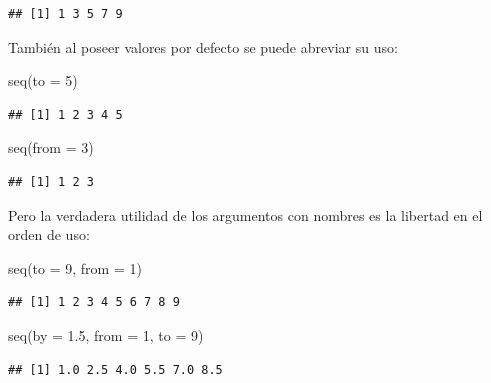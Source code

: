 \documentclass[
]{book}
\newenvironment{Shaded}{\begin{snugshade}}{\end{snugshade}}
\newcommand{\AttributeTok}[1]{\textcolor[rgb]{0.77,0.63,0.00}{#1}}
\newcommand{\DecValTok}[1]{\textcolor[rgb]{0.00,0.00,0.81}{#1}}
\newcommand{\FloatTok}[1]{\textcolor[rgb]{0.00,0.00,0.81}{#1}}
\newcommand{\FunctionTok}[1]{\textcolor[rgb]{0.00,0.00,0.00}{#1}}
\newcommand{\NormalTok}[1]{#1}
\begin{document}
\begin{verbatim}
## [1] 1 3 5 7 9
\end{verbatim}

También al poseer valores por defecto se puede abreviar su uso:

\begin{Shaded}
\begin{Highlighting}[]
\FunctionTok{seq}\NormalTok{(}\AttributeTok{to =} \DecValTok{5}\NormalTok{)}
\end{Highlighting}
\end{Shaded}

\begin{verbatim}
## [1] 1 2 3 4 5
\end{verbatim}

\begin{Shaded}
\begin{Highlighting}[]
\FunctionTok{seq}\NormalTok{(}\AttributeTok{from =} \DecValTok{3}\NormalTok{)}
\end{Highlighting}
\end{Shaded}

\begin{verbatim}
## [1] 1 2 3
\end{verbatim}

Pero la verdadera utilidad de los argumentos con nombres es la libertad en el orden de uso:

\begin{Shaded}
\begin{Highlighting}[]
\FunctionTok{seq}\NormalTok{(}\AttributeTok{to =} \DecValTok{9}\NormalTok{, }\AttributeTok{from =} \DecValTok{1}\NormalTok{)}
\end{Highlighting}
\end{Shaded}

\begin{verbatim}
## [1] 1 2 3 4 5 6 7 8 9
\end{verbatim}

\begin{Shaded}
\begin{Highlighting}[]
\FunctionTok{seq}\NormalTok{(}\AttributeTok{by =} \FloatTok{1.5}\NormalTok{, }\AttributeTok{from =} \DecValTok{1}\NormalTok{, }\AttributeTok{to =} \DecValTok{9}\NormalTok{)}
\end{Highlighting}
\end{Shaded}

\begin{verbatim}
## [1] 1.0 2.5 4.0 5.5 7.0 8.5
\end{verbatim}
\end{document}
